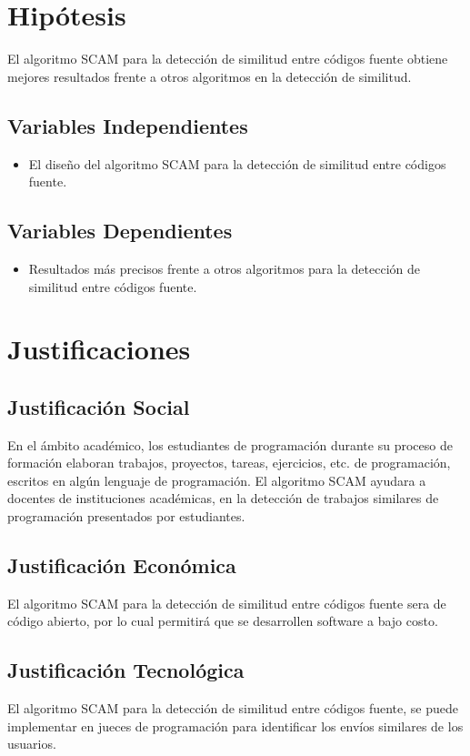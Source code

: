 \section{Hipótesis}
El algoritmo SCAM para la detección de similitud entre códigos fuente obtiene mejores resultados frente a otros algoritmos en la detección de similitud.
\subsection{Variables Independientes}
\begin{itemize}
    \item El diseño del algoritmo SCAM para la detección de similitud entre códigos fuente.
\end{itemize}
\subsection{Variables Dependientes}
\begin{itemize}
    \item Resultados más precisos frente a otros algoritmos para la detección de similitud entre códigos fuente.
\end{itemize}
\section{Justificaciones}
\subsection{Justificación Social}
En el ámbito académico, los estudiantes de programación durante su proceso de formación elaboran trabajos, proyectos, tareas, ejercicios, etc. de programación, escritos en algún lenguaje de programación. El algoritmo SCAM ayudara a docentes de instituciones académicas, en la detección de trabajos similares de programación presentados por estudiantes.
\subsection{Justificación Económica}
El algoritmo SCAM para la detección de similitud entre códigos fuente sera de código abierto, por lo cual permitirá que se desarrollen software a bajo costo.
\subsection{Justificación Tecnológica}
El algoritmo SCAM para la detección de similitud entre códigos fuente, se puede implementar en jueces de programación para identificar los envíos similares de los usuarios.
